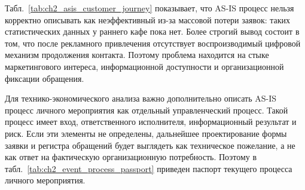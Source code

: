 Табл.~\ref{tab:ch2_asis_customer_journey} показывает, что AS-IS процесс нельзя корректно описывать как неэффективный из-за массовой потери заявок: таких статистических данных у раннего кафе пока нет. Более строгий вывод состоит в том, что после рекламного привлечения отсутствует воспроизводимый цифровой механизм продолжения контакта. Поэтому проблема находится на стыке маркетингового интереса, информационной доступности и организационной фиксации обращения.

Для технико-экономического анализа важно дополнительно описать AS-IS процесс личного мероприятия как отдельный управленческий процесс. Такой процесс имеет вход, ответственного исполнителя, информационный результат и риск. Если эти элементы не определены, дальнейшее проектирование формы заявки и регистра обращений будет выглядеть как техническое пожелание, а не как ответ на фактическую организационную потребность. Поэтому в табл.~\ref{tab:ch2_event_process_passport} приведен паспорт текущего процесса личного мероприятия.

